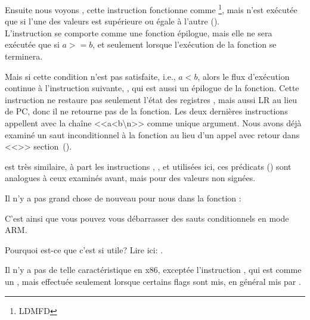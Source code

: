 
Ensuite nous voyons , cette instruction fonctionne comme \footnote{\ac{LDMFD}},
mais n'est exécutée que si l'une des valeurs est supérieure ou égale à l'autre
().\\
L'instruction  se comporte comme une fonction épilogue,
mais elle ne sera exécutée que si $a>=b$, et seulement lorsque l'exécution de la
fonction se terminera.


Mais si cette condition n'est pas satisfaite, i.e., $a<b$, alors le flux d'exécution
continue à l'instruction suivante, , qui est aussi
un épilogue de la fonction. Cette instruction ne restaure pas seulement l'état des
registres , mais aussi \ac{LR} au lieu de \ac{PC}, donc il ne retourne
pas de la fonction.
Les deux dernières instructions appellent \printf avec la chaîne <<a<b\textbackslash{}n>>
comme unique argument.
Nous avons déjà examiné un saut inconditionnel à la fonction \printf au lieu
d'un appel avec retour dans <<\PrintfSeveralArgumentsSectionName>> section~().

 est très similaire, à part les instructions , ,
et  utilisées ici, ces prédicats () sont analogues à ceux examinés avant, mais pour des
valeurs non signées.

Il n'y a pas grand chose de nouveau pour nous dans la fonction \main:



C'est ainsi que vous pouvez vous débarrasser des sauts conditionnels en mode ARM.

Pourquoi est-ce que c'est si utile? Lire ici: .


Il n'y a pas de telle caractéristique en x86, exceptée l'instruction ,
qui est comme un \MOV, mais effectuée seulement lorsque certains flags sont mis,
en général mis par \CMP.

\mysubparagraph{\OptimizingKeilVI (\ThumbMode)}

